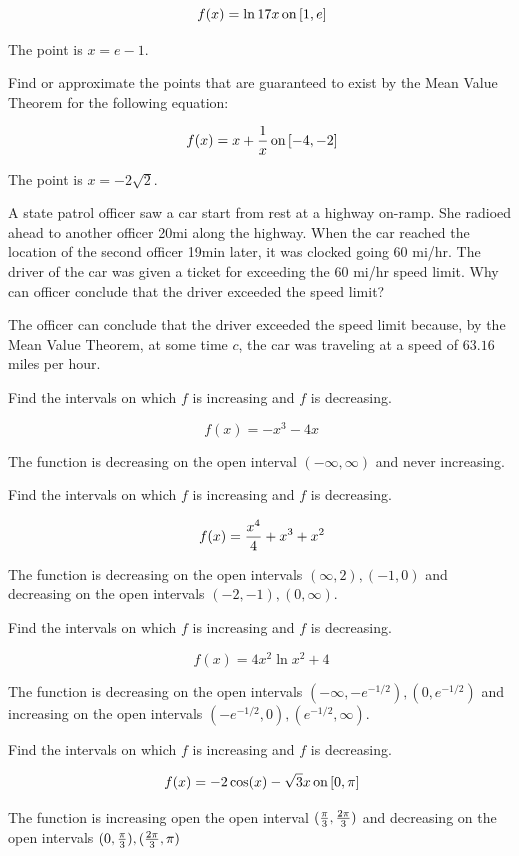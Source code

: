 $$\
f(x) = \ln 17x \, \hbox{on} \, [1, e]
$$

The point is $x = e - 1$.

Find or approximate the points that are guaranteed to exist
by the Mean Value Theorem for the following equation:

$$\
f(x) = x + {1 \over x} \, \hbox{on} \, [-4, -2]
$$

The point is $x = -2\sqrt{2}$.

A state patrol officer saw a car start from rest at a highway
on-ramp. She radioed ahead to another officer 20mi along the
highway. When the car reached the location of the second
officer 19min later, it was clocked going 60 mi/hr. The driver
of the car was given a ticket for exceeding the 60 mi/hr
speed limit. Why can officer conclude that the driver exceeded
the speed limit?

The officer can conclude that the driver exceeded the speed
limit because, by the Mean Value Theorem, at some time $c$,
the car was traveling at a speed of $63.16$ miles per hour.

Find the intervals on which $f$ is increasing and $f$ is decreasing.

$$\
f(x) = -x^3 - 4x
$$

The function is decreasing on the open interval $(-\infty, \infty)$ and
never increasing.

\problem{4.3.27}
Find the intervals on which $f$ is increasing and $f$ is decreasing.

$$\
f(x) = {x^4 \over 4} + x^3 + x^2
$$

The function is decreasing on the open intervals $(\infty, 2), (-1, 0)$
and decreasing on the open intervals $(-2, -1), (0, \infty)$.

\problem{4.3.29}
Find the intervals on which $f$ is increasing and $f$ is decreasing.

$$\
f(x) = 4x^2\ln x^2 + 4
$$

The function is decreasing on the open intervals $(-\infty, -e^{-1/2}), (0, e^{-1/2})$
and increasing on the open intervals $(-e^{-1/2}, 0), (e^{-1/2}, \infty)$.

Find the intervals on which $f$ is increasing and $f$ is decreasing.

$$\
f(x) = -2 \cos (x) - \sqrt{3} x \, \hbox{on} \, [0, \pi]
$$

\solution{4.3.31}
The function is increasing open the open interval $({\pi \over 3}, {2\pi \over 3})$
and decreasing on the open intervals $(0, {\pi \over 3}), ({2 \pi \over 3}, \pi)$

